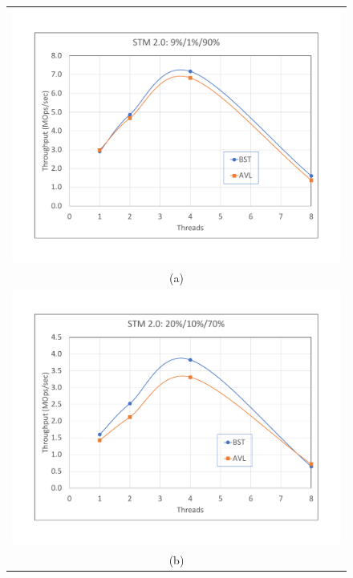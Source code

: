 \documentclass[conference]{IEEEtran}
\begin{document}
\begin{figure}[H]
\begin{tabular}{c}
\includegraphics[width =\linewidth]{figures/stm2-9-1-90}\\
(a) \\
\includegraphics[width =\linewidth]{figures/stm2-20-10-70}\\
(b) \\

\end{tabular}
\end{figure}
\end{document}
